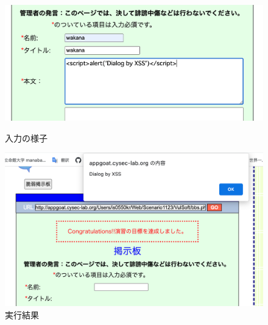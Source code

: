 \documentclass[dvipdfmx,autodetect-engine,titlepage]{jsarticle}
\begin{document}
\begin{figure}[H]
  \centering
  \begin{minipage}[b]{0.45\linewidth}
  \begin{center}
    \includegraphics[keepaspectratio,scale=0.32]{web9.png}
    \end{center}
    \caption{入力の様子}
  \end{minipage}
  \begin{minipage}[b]{0.45\linewidth}
  \begin{center}
    \includegraphics[keepaspectratio,scale=0.32]{web10.png}
    \end{center}
    \caption{実行結果}
  \end{minipage}
\end{figure}
\end{document}
